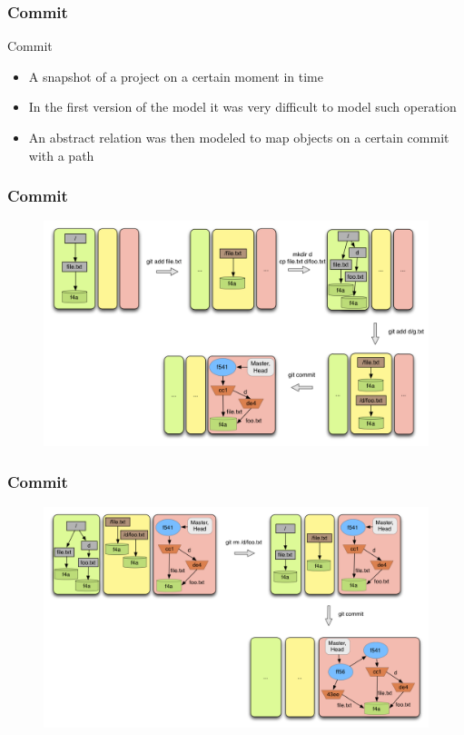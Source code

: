 \documentclass{beamer}
\begin{document}
\begin{frame}
	\frametitle{Commit}

	\begin{block}{Commit}
	\begin{itemize}
	\item A snapshot of a project on a certain moment in time
	\item In the first version of the model it was very difficult to
   model such operation
	\item An abstract relation was then modeled to map objects on a
   certain commit with a path
	\end{itemize}
	\end{block}

\end{frame}

\begin{frame}[fragile]
   \frametitle{Commit}
   \begin{figure}
      \centering
      \includegraphics[width=1.0\textwidth]{images/commit1.png}
   \end{figure}
\end{frame}

\begin{frame}[fragile]
   \frametitle{Commit}
   \begin{figure}
      \centering
      \includegraphics[width=1.0\textwidth]{images/commit2.png}
   \end{figure}
\end{frame}
\end{document}
